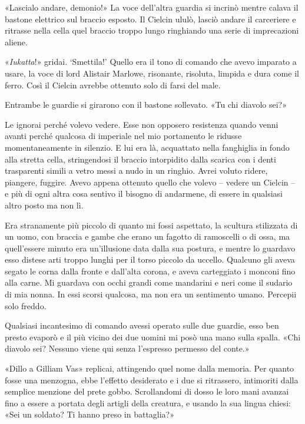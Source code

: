 «Lascialo andare, demonio!» La voce dell'altra guardia si incrinò mentre
calava il bastone elettrico sul braccio esposto. Il Cielcin ululò,
lasciò andare il carceriere e ritrasse nella cella quel braccio troppo
lungo ringhiando una serie di imprecazioni aliene.

«\emph{Iukatta}!» gridai. `Smettila!' Quello era il tono di comando che
avevo imparato a usare, la voce di lord Alistair Marlowe, risonante,
risoluta, limpida e dura come il ferro. Così il Cielcin avrebbe ottenuto
solo di farsi del male.

Entrambe le guardie si girarono con il bastone sollevato. «Tu chi
diavolo sei?»

Le ignorai perché volevo vedere. Esse non opposero resistenza quando
venni avanti perché qualcosa di imperiale nel mio portamento le ridusse
momentaneamente in silenzio. E lui era là, acquattato nella fanghiglia
in fondo alla stretta cella, stringendosi il braccio intorpidito dalla
scarica con i denti trasparenti simili a vetro messi a nudo in un
ringhio. Avrei voluto ridere, piangere, fuggire. Avevo appena ottenuto
quello che volevo -- vedere un Cielcin -- e più di ogni altra cosa
sentivo il bisogno di andarmene, di essere in qualsiasi altro posto ma
non lì.

Era stranamente più piccolo di quanto mi fossi aspettato, la scultura
stilizzata di un uomo, con braccia e gambe che erano un fagotto di
ramoscelli o di ossa, ma quell'essere minuto era un'illusione data dalla
sua postura, e mentre lo guardavo esso distese arti troppo lunghi per il
torso piccolo da uccello. Qualcuno gli aveva segato le corna dalla
fronte e dall'alta corona, e aveva carteggiato i monconi fino alla
carne. Mi guardava con occhi grandi come mandarini e neri come il
sudario di mia nonna. In essi scorsi qualcosa, ma non era un sentimento
umano. Percepii solo freddo.

Qualsiasi incantesimo di comando avessi operato sulle due guardie, esso
ben presto evaporò e il più vicino dei due uomini mi posò una mano sulla
spalla. «Chi diavolo sei? Nessuno viene qui senza l'espresso permesso
del conte.»

«Dillo a Gilliam Vas» replicai, attingendo quel nome dalla memoria. Per
quanto fosse una menzogna, ebbe l'effetto desiderato e i due si
ritrassero, intimoriti dalla semplice menzione del prete gobbo.
Scrollandomi di dosso le loro mani avanzai fino a essere a portata degli
artigli della creatura, e usando la sua lingua chiesi: «Sei un soldato?
Ti hanno preso in battaglia?»

